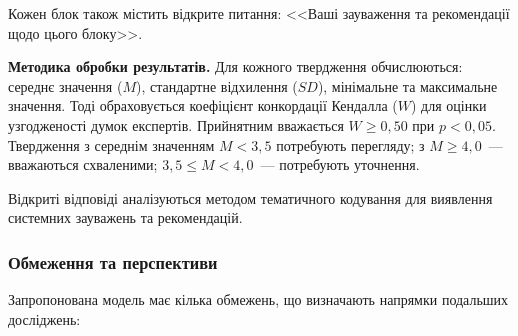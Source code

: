 Кожен блок також містить відкрите питання: <<Ваші зауваження та рекомендації щодо цього блоку>>.

\textbf{Методика обробки результатів.} Для кожного твердження обчислюються: середнє значення ($M$), стандартне відхилення ($SD$), мінімальне та максимальне значення. Тоді обраховується коефіцієнт конкордації Кендалла ($W$) для оцінки узгодженості думок експертів. Прийнятним вважається $W \geq 0{,}50$ при $p < 0{,}05$. Твердження з середнім значенням $M < 3{,}5$ потребують перегляду; з $M \geq 4{,}0$~--- вважаються схваленими; $3{,}5 \leq M < 4{,}0$~--- потребують уточнення.

Відкриті відповіді аналізуються методом тематичного кодування для виявлення системних зауважень та рекомендацій.

\subsubsection{Обмеження та перспективи}\label{sssec:3.3.7}

Запропонована модель має кілька обмежень, що визначають напрямки подальших досліджень:


